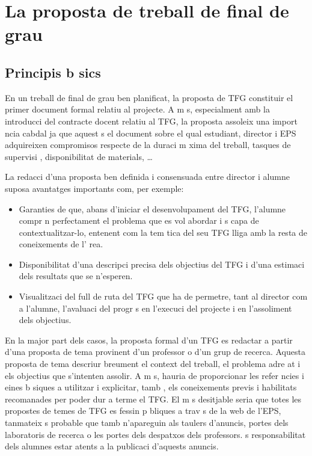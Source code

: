 \chapter{La proposta de treball de final de grau}\label{proposta}

\section{Principis b sics}
En un treball de final de grau ben planificat, la proposta de \ac{TFG} constituir  el primer document formal relatiu al projecte. A m s, especialment amb la introducci  del contracte docent relatiu al \ac{TFG}, la proposta assoleix una import ncia cabdal ja que aquest  s el document sobre el qual estudiant, director i \ac{EPS} adquireixen compromisos respecte de la duraci  m xima del treball, tasques de supervisi , disponibilitat de materials, \ldots

La redacci  d'una proposta ben definida i consensuada entre director i alumne suposa avantatges importants com, per exemple:
\begin{itemize}
\item Garanties de que, abans d'iniciar el desenvolupament del \ac{TFG}, l'alumne compr n perfectament el problema que es vol abordar i  s capa  de contextualitzar-lo, entenent com la tem tica del seu \ac{TFG} lliga amb la resta de coneixements de l' rea.

\item Disponibilitat d'una descripci  precisa dels objectius del \ac{TFG} i d'una estimaci  dels resultats que se n'esperen.

\item Visualitzaci  del full de ruta del \ac{TFG} que ha de permetre, tant al director com a l'alumne, l'avaluaci  del progr s en l'execuci  del projecte i en l'assoliment dels objectius.
\end{itemize}

En la major part dels casos, la proposta formal d'un \ac{TFG} es redactar  a partir d'una proposta de tema provinent d'un professor o d'un grup de recerca. Aquesta proposta de tema descriur  breument el context del treball, el problema adre at i els objectius que s'intenten assolir. A m s, hauria de proporcionar les refer ncies i eines b siques a utilitzar i explicitar, tamb , els coneixements previs i habilitats recomanades per poder dur a terme el \ac{TFG}. El m s desitjable seria que totes les propostes de temes de \ac{TFG} es fessin p bliques a trav s de la web de l'\ac{EPS}, tanmateix  s probable que tamb  n'apareguin als taulers d'anuncis, portes dels laboratoris de recerca o les portes dels despatxos dels professors.  s responsabilitat dels alumnes estar atents a la publicaci  d'aquests anuncis.

